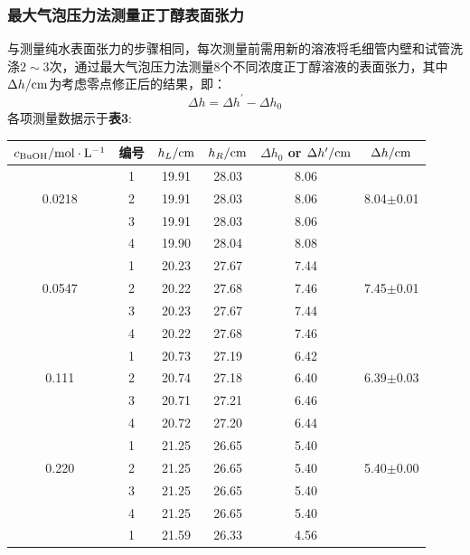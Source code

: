 \documentclass[12pt]{article}
\begin{document}
			\subsubsection{最大气泡压力法测量正丁醇表面张力}
			与测量纯水表面张力的步骤相同，每次测量前需用新的溶液将毛细管内壁和试管洗涤$2\sim 3$次，通过最大气泡压力法测量8个不同浓度正丁醇溶液的表面张力，其中$\Delta h/{\rm cm}$为考虑零点修正后的结果，即：
			$$
			\Delta h=\Delta h^{\prime}-\Delta h_{0}
			$$
 			各项测量数据示于\textbf{表3}:\par
			\begin{table}[h]
				\centering
				\begin{tabular}{cccccc}
					\toprule
					$c_{\rm BuOH}/{\rm mol\cdot L^{-1}}$ & 编号 & $h_{L}/{\rm cm}$ & $h_{R}/{\rm cm}$ & $\Delta h_{0}$ or $\Delta h^{\prime}/{\rm cm}$ & $\Delta h/{\rm cm}$  \\
					\midrule
		   ~      & 1  &19.91 & 28.03 & 8.06 & ~ \\
		   0.0218 & 2  &19.91 & 28.03 & 8.06 & 8.04$\pm$0.01 \\
		   ~      & 3  &19.91 & 28.03 & 8.06 & \\
		   		  & 4  &19.90 & 28.04 & 8.08 & \\
					\midrule
		   ~      & 1  &20.23 & 27.67 & 7.44 & ~ \\
		   0.0547 & 2  &20.22 & 27.68 & 7.46 & 7.45$\pm$0.01\\
		   ~      & 3  &20.23 & 27.67 & 7.44 & \\
		   		  & 4  &20.22 & 27.68 & 7.46 & \\
		   \midrule
		   ~      & 1  &20.73 & 27.19 & 6.42 & ~ \\
		   0.111  & 2  &20.74 & 27.18 & 6.40 & 6.39$\pm$0.03\\
		   ~      & 3  &20.71 & 27.21 & 6.46 & ~ \\
		   		  & 4  &20.72 & 27.20 & 6.44 & ~ \\
		   \midrule
		   ~      & 1  &21.25 & 26.65 & 5.40 & ~ \\
		   0.220  & 2  &21.25 & 26.65 & 5.40 & 5.40$\pm$0.00\\
		   ~      & 3  &21.25 & 26.65 & 5.40 & ~ \\
		   		  & 4  &21.25 & 26.65 & 5.40 & ~ \\
		   \midrule
		   ~      & 1  &21.59 & 26.33 & 4.56 & ~ \\

\end{tabular}
\end{table}
\end{document}
